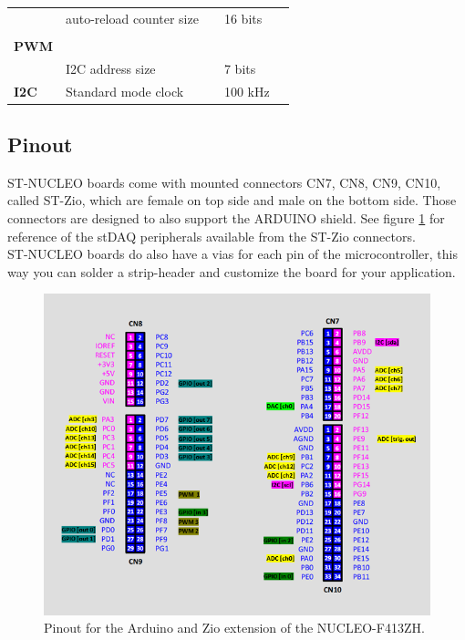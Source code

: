 \documentclass[letterpaper,10pt,english]{hitec}
\begin{document}
\begin{table}[h!]
\begin{tabular}{l|l|lll}
\cellcolor[HTML]{C0C0C0}                                 & auto-reload counter size            &               & 16 bits       &               \\
\cellcolor[HTML]{C0C0C0}                                 &                                     &               &               &               \\
\multirow{-3}{*}{\cellcolor[HTML]{C0C0C0}\textbf{PWM}}   &                                     &               &               &               \\ \hline
\cellcolor[HTML]{C0C0C0}                                 & I2C address size                    &               & 7 bits        &               \\
\multirow{-2}{*}{\cellcolor[HTML]{C0C0C0}\textbf{I2C}}   & Standard mode clock                 &               & 100 kHz       &              
\end{tabular}
\end{table}

\newpage 

\subsection{Pinout}

ST-NUCLEO boards come with mounted connectors CN7, CN8, CN9, CN10, called ST-Zio, which are female on top side and male on the bottom side. Those connectors are designed to also support the ARDUINO shield.
See figure \ref{fig:pinout} for reference of the stDAQ peripherals available from the ST-Zio connectors. \\
ST-NUCLEO boards do also have a vias for each pin of the microcontroller, this way you can solder a strip-header and customize the board for your application.

\begin{figure}[ht!]
\includegraphics[scale=0.7]{../img/nucleo_f413zh_zio_ex.png}
\caption{Pinout for the Arduino and Zio extension of the NUCLEO-F413ZH.}
\label{fig:pinout}
\end{figure}
\end{document}
